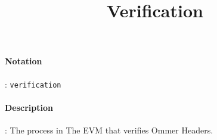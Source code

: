 \documentclass[10pt,a4paper,oneside]{scrartcl}
\author{}
\title{Verification}
\date{}
\begin{document}
\maketitle
\paragraph{Notation}: \texttt{verification}
\paragraph{Description}: The process in The EVM that verifies Ommer Headers.

\printbibliography
\end{document}
